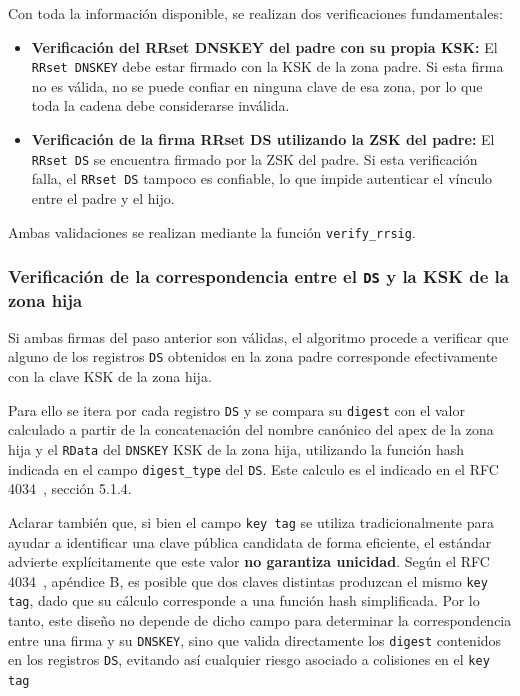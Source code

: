 Con toda la información disponible, se realizan dos verificaciones fundamentales:

\begin{itemize}
    \item \textbf{Verificación del RRset DNSKEY del padre con su propia KSK: } El \texttt{RRset DNSKEY} debe estar firmado con la KSK de la zona padre.
          Si esta firma no es válida, no se puede confiar en ninguna clave de esa zona, por lo que toda la cadena debe considerarse inválida.
    \item \textbf{Verificación de la firma RRset DS utilizando la ZSK del padre: } El \texttt{RRset DS} se encuentra firmado por la ZSK del padre.
          Si esta verificación falla, el \texttt{RRset DS} tampoco es confiable, lo que impide autenticar el vínculo entre el padre y el hijo.
\end{itemize}

Ambas validaciones se realizan mediante la función \texttt{verify\_rrsig}.

\subsubsection{Verificación de la correspondencia entre el \texttt{DS} y la KSK de la zona hija}

Si ambas firmas del paso anterior son válidas, el algoritmo procede a verificar que alguno de los registros \texttt{DS} obtenidos en la zona padre corresponde efectivamente con la 
clave KSK de la zona hija.

Para ello se itera por cada registro \texttt{DS} y se compara su \texttt{digest} con el valor calculado a partir de la concatenación del nombre canónico del apex de la zona hija
y el \texttt{RData} del \texttt{DNSKEY} KSK de la zona hija, utilizando la función hash indicada en el campo \texttt{digest\_type} del \texttt{DS}. 
Este calculo es el indicado en el RFC 4034~\cite{RFC4034}, sección 5.1.4.

Aclarar también que, si bien el campo \texttt{key tag} se utiliza tradicionalmente para ayudar a identificar una clave pública candidata de forma eficiente, el estándar advierte 
explícitamente que este valor \textbf{no garantiza unicidad}. Según el RFC 4034~\cite{RFC4034}, apéndice B, es posible que dos claves distintas produzcan el mismo \texttt{key tag}, 
dado que su cálculo corresponde a una función hash simplificada. Por lo tanto, este diseño no depende de dicho campo para determinar la correspondencia entre una firma y 
su \texttt{DNSKEY}, sino que valida directamente los \texttt{digest} contenidos en los registros \texttt{DS}, evitando así cualquier riesgo asociado a colisiones en el \texttt{key tag}

